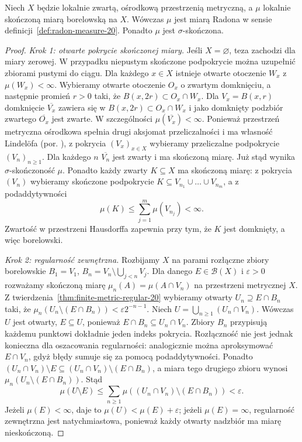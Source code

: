 \begin{twierdzenie}
\label{thm:lch-secondcountable-radon-20}
Niech $X$ będzie lokalnie zwartą, ośrodkową
przestrzenią metryczną, a $\mu$ lokalnie skończoną
miarą borelowską na $X$. Wówczas $\mu$ jest miarą
Radona w sensie definicji~\ref{def:radon-measure-20}.
Ponadto $\mu$ jest $\sigma$-skończona.
\end{twierdzenie}
\begin{proof}
\emph{Krok 1: otwarte pokrycie skończonej miary.}
Jeśli $X=\varnothing$, teza zachodzi dla miary zerowej.
W przypadku niepustym skończone podpokrycie można
uzupełnić zbiorami pustymi do ciągu.
Dla każdego $x\in X$ istnieje otwarte otoczenie $W_x$
z $\mu(W_x)<\infty$. Wybieramy otwarte otoczenie $O_x$ o zwartym domknięciu, a następnie promień $r>0$ taki, że $B(x,2r)\subset O_x\cap W_x$. Dla $V_x=B(x,r)$ domknięcie $\overline{V_x}$ zawiera się w $B(x,2r)\subset O_x\cap W_x$ i jako domknięty podzbiór zwartego $\overline{O_x}$ jest zwarte.
W szczególności $\mu(\overline{V_x})<\infty$.
Ponieważ przestrzeń metryczna ośrodkowa spełnia drugi
aksjomat przeliczalności i ma własność Lindelöfa
(por. ),
z pokrycia $(V_x)_{x\in X}$ wybieramy przeliczalne
podpokrycie $(V_n)_{n\ge1}$. Dla każdego $n$
$\overline{V_n}$ jest zwarty i ma skończoną miarę.
Już stąd wynika $\sigma$-skończoność $\mu$.
Ponadto każdy zwarty $K\subseteq X$ ma skończoną
miarę: z pokrycia $(V_n)$ wybieramy skończone
podpokrycie $K\subseteq V_{n_1}\cup\dots\cup V_{n_m}$,
a z podaddytywności
\[
 \mu(K)\le\sum_{j=1}^m\mu(V_{n_j})<\infty.
\]
Zwartość w przestrzeni Hausdorffa zapewnia przy tym,
że $K$ jest domknięty, a więc borelowski.

\emph{Krok 2: regularność zewnętrzna.}
Rozbijamy $X$ na parami rozłączne zbiory borelowskie
$B_1=V_1$, $B_n=V_n\setminus\bigcup_{j<n}V_j$.
Dla danego $E\in\mathcal B(X)$ i $\varepsilon>0$
rozważamy skończoną miarę
$\mu_n(A)=\mu(A\cap V_n)$ na przestrzeni metrycznej $X$.
Z twierdzenia~\ref{thm:finite-metric-regular-20}
wybieramy otwarty $U_n\supseteq E\cap B_n$ taki, że
$\mu_n(U_n\setminus(E\cap B_n))<\varepsilon2^{-n-1}$.
Niech $U=\bigcup_{n\ge1}(U_n\cap V_n)$.
Wówczas $U$ jest otwarty, $E\subseteq U$, ponieważ
$E\cap B_n\subseteq U_n\cap V_n$. Zbiory $B_n$ przypisują każdemu punktowi dokładnie jeden indeks pokrycia. Rozłączność nie jest jednak konieczna dla oszacowania regularności: analogicznie można aproksymować $E\cap V_n$, gdyż błędy sumuje się za pomocą podaddytywności.
Ponadto $(U_n\cap V_n)\setminus E\subseteq (U_n\cap V_n)\setminus(E\cap B_n)$, a miara tego drugiego zbioru wynosi $\mu_n(U_n\setminus(E\cap B_n))$. Stąd
\[
\mu(U\setminus E)
\le\sum_{n\ge1}\mu((U_n\cap V_n)\setminus(E\cap B_n))
<\varepsilon.
\]
Jeżeli $\mu(E)<\infty$, daje to
$\mu(U)<\mu(E)+\varepsilon$; jeżeli $\mu(E)=\infty$,
regularność zewnętrzna jest natychmiastowa,
ponieważ każdy otwarty nadzbiór ma miarę nieskończoną.


\end{proof}
